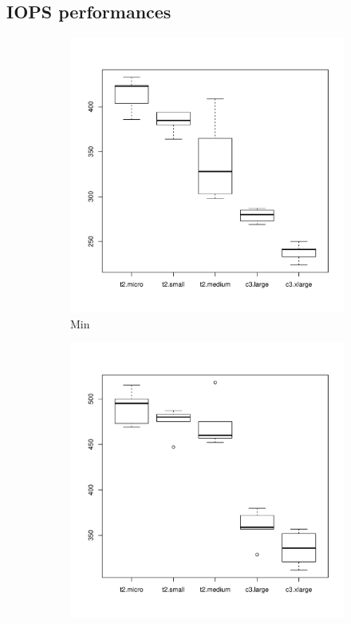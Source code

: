 \documentclass[10pt, conference]{IEEEtran}
\begin{document}
\subsection{IOPS performances}


\begin{figure}
	\begin{subfigure}[b]{0.24\textwidth}
                \includegraphics[width=\textwidth]{plots/iopingMin.pdf}
                \caption{Min}
                \label{fig:min}
        \end{subfigure}
        \begin{subfigure}[b]{0.24\textwidth}
                \includegraphics[width=\textwidth]{plots/iopingAvr.pdf}

\end{subfigure}
\end{figure}
\end{document}
